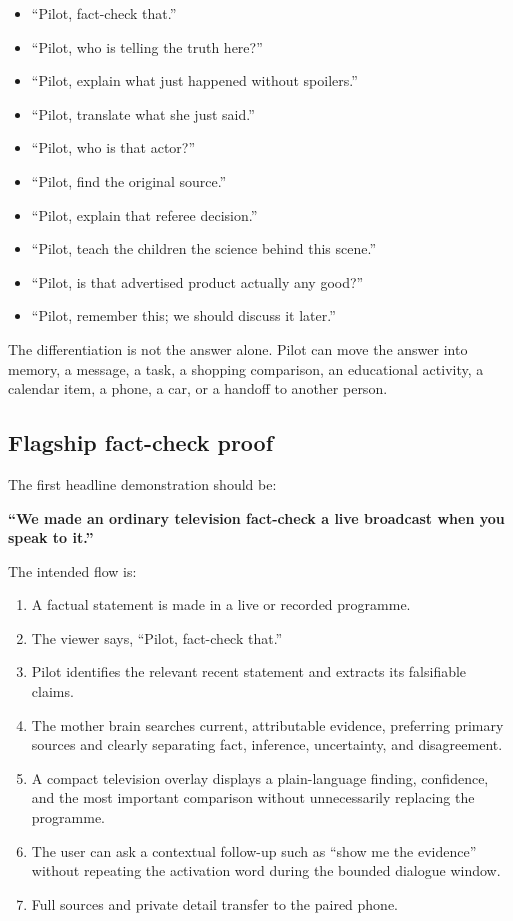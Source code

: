 \documentclass[11pt,a4paper]{article}
\begin{document}
\begin{itemize}[leftmargin=*]
  \item ``Pilot, fact-check that.''
  \item ``Pilot, who is telling the truth here?''
  \item ``Pilot, explain what just happened without spoilers.''
  \item ``Pilot, translate what she just said.''
  \item ``Pilot, who is that actor?''
  \item ``Pilot, find the original source.''
  \item ``Pilot, explain that referee decision.''
  \item ``Pilot, teach the children the science behind this scene.''
  \item ``Pilot, is that advertised product actually any good?''
  \item ``Pilot, remember this; we should discuss it later.''
\end{itemize}

The differentiation is not the answer alone.  Pilot can move the answer into
memory, a message, a task, a shopping comparison, an educational activity, a
calendar item, a phone, a car, or a handoff to another person.

\subsection{Flagship fact-check proof}

The first headline demonstration should be:

\begin{center}
\Large\textbf{``We made an ordinary television fact-check a live broadcast
when you speak to it.''}
\end{center}

The intended flow is:

\begin{enumerate}[leftmargin=*]
  \item A factual statement is made in a live or recorded programme.
  \item The viewer says, ``Pilot, fact-check that.''
  \item Pilot identifies the relevant recent statement and extracts its
        falsifiable claims.
  \item The mother brain searches current, attributable evidence, preferring
        primary sources and clearly separating fact, inference, uncertainty,
        and disagreement.
  \item A compact television overlay displays a plain-language finding,
        confidence, and the most important comparison without unnecessarily
        replacing the programme.
  \item The user can ask a contextual follow-up such as ``show me the
        evidence'' without repeating the activation word during the bounded
        dialogue window.
  \item Full sources and private detail transfer to the paired phone.
\end{enumerate}
\end{document}
